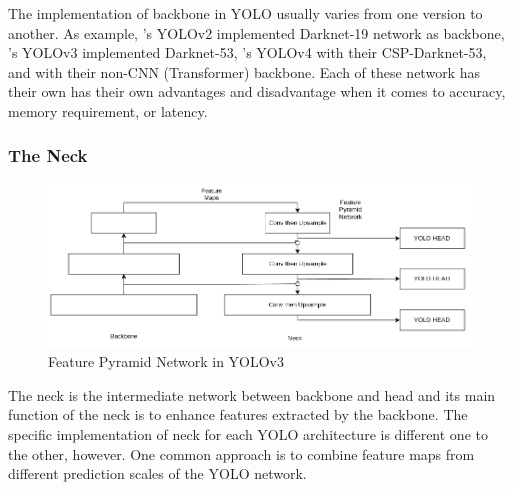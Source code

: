     The implementation of backbone in YOLO usually varies from one version to another.
    As example, \textcite{yolov2}'s YOLOv2 implemented Darknet-19 network as backbone, 
    \textcite{yolov3}'s YOLOv3 implemented Darknet-53, \textcite{yolov4}'s YOLOv4
    with their CSP-Darknet-53, and \textcite{vityolo} with their non-CNN (Transformer) backbone.
    Each of these network has their own has their own advantages and disadvantage when
    it comes to accuracy, memory requirement, or latency.


    \subsubsection{The Neck}
  
    \begin{figure}
        \centering
        \includegraphics[scale=0.55]{figures/yolo-architecture-rough.png}
        \caption{Feature Pyramid Network in YOLOv3}
        \label{fig:yolofpn}
    \end{figure}

    The neck is the intermediate network between backbone and head and its
    main function of the neck is to enhance features extracted by the backbone.
    The specific implementation of neck for each YOLO architecture is different one to the other, however.
    One common approach is to combine feature maps from different prediction scales of the YOLO network.

